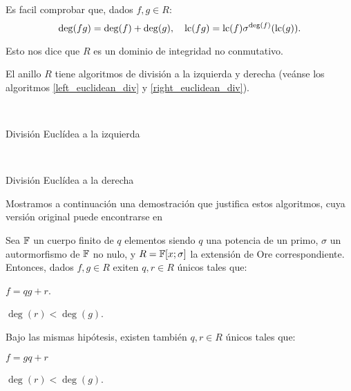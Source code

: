 Es facil comprobar que, dados \(f, g \in R\):
\[
\deg(fg) = \deg(f) + \deg(g), \quad \operatorname{lc}(fg) = \operatorname{lc}(f)\sigma^{\deg(f)}(\operatorname{lc}(g))
.\]

Esto nos dice que \(R\) es un dominio de integridad no conmutativo.

El anillo \(R\) tiene algoritmos de división a la izquierda y derecha (veánse los algoritmos \ref{left_euclidean_div} y \ref{right_euclidean_div}).

\begin{algorithm}[H]
 \label{left_euclidean_div}
  \\
 \caption{División Euclídea a la izquierda}
\end{algorithm}

\begin{algorithm}[H]
 \label{right_euclidean_div}
  \\
 \caption{División Euclídea a la derecha}
\end{algorithm}

Mostramos a continuación una demostración que justifica estos algoritmos, cuya versión original puede encontrarse en~\cite[Th. 4.34]{bueso2003algorithmic}

\begin{theorem}
Sea \(\mathbb{F}\) un cuerpo finito de \(q\) elementos siendo \(q\) una potencia de un primo,  \(\sigma\) un autormorfismo de \(\mathbb{F}\) no nulo, y \(R = \mathbb{F}[x;\sigma]\) la extensión de Ore correspondiente. Entonces, dados \(f, g \in R\) exiten \(q, r \in R\) únicos tales que:
\begin{nlist}
    \item \(f = qg + r\).
    \item \(\deg(r) < \deg(g)\).
\end{nlist}

Bajo las mismas hipótesis, existen también \(q, r \in R\) únicos tales que:
\begin{nlist}
    \item \(f = gq + r\)
    \item \(\deg(r) < \deg(g)\).
\end{nlist}
\end{theorem}

